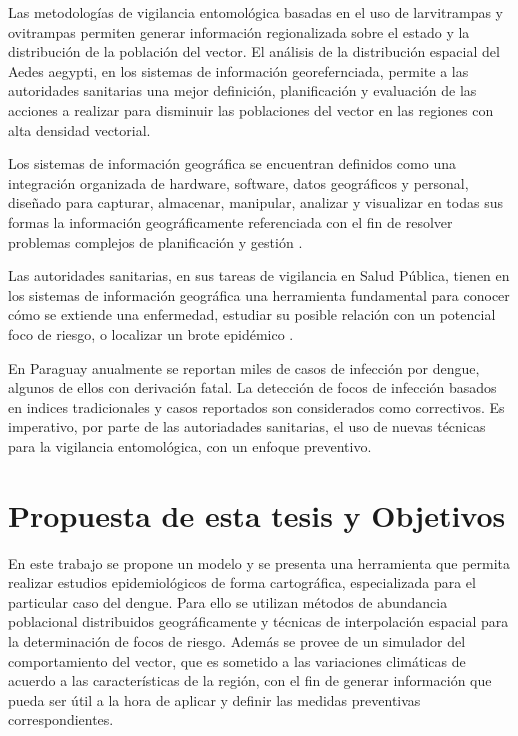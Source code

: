 Las metodologías de vigilancia entomológica basadas en el uso de larvitrampas y ovitrampas
permiten generar información regionalizada sobre el estado y la distribución de la población del
vector. El análisis de la distribución espacial del Aedes aegypti, en los sistemas de información
georefernciada, permite a las autoridades sanitarias una mejor definición, planificación y
evaluación de las acciones a realizar para disminuir las poblaciones del vector en las regiones
con alta densidad vectorial.

Los sistemas de información geográfica se encuentran definidos como una integración organizada de
hardware, software, datos geográficos y personal, diseñado para capturar, almacenar, manipular,
analizar y visualizar en todas sus formas la información geográficamente referenciada con el fin
de resolver problemas complejos de planificación y gestión \citep{lopezMarcos2007}.

Las autoridades sanitarias, en sus tareas de vigilancia en Salud Pública, tienen en los sistemas
de información geográfica una herramienta fundamental para conocer cómo se extiende una
enfermedad, estudiar su posible relación con un potencial foco de riesgo, o localizar un brote
epidémico \cite{vgomesAegis2001}.

En Paraguay anualmente se reportan miles de casos de infección por dengue, algunos de ellos con
derivación fatal. La detección de focos de infección basados en indices tradicionales y casos
reportados son considerados como correctivos. Es imperativo, por parte de las autoriadades
sanitarias, el uso de nuevas técnicas para la vigilancia entomológica, con un enfoque preventivo.

\section{Propuesta de esta tesis y Objetivos}

En este trabajo se propone un modelo y se presenta una herramienta que permita realizar estudios
epidemiológicos de forma cartográfica, especializada para el particular caso del dengue. Para ello
se utilizan métodos de abundancia poblacional distribuidos geográficamente y técnicas de
interpolación espacial para la determinación de focos de riesgo. Además se provee de un simulador
del comportamiento del vector, que es sometido a las variaciones climáticas de acuerdo a las
características de la región, con el fin de generar información que pueda ser útil a la hora de
aplicar y definir las medidas preventivas correspondientes.

